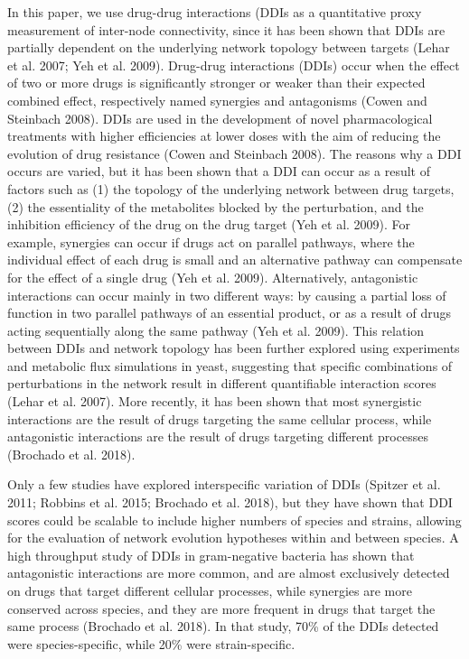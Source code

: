 \documentclass[
]{article}
\begin{document}
In this paper, we use drug-drug interactions (DDIs as a quantitative proxy measurement of inter-node connectivity, since it has been shown that DDIs are partially dependent on the underlying network topology between targets (Lehar et al. 2007; Yeh et al. 2009). Drug-drug interactions (DDIs) occur when the effect of two or more drugs is significantly stronger or weaker than their expected combined effect, respectively named synergies and antagonisms (Cowen and Steinbach 2008). DDIs are used in the development of novel pharmacological treatments with higher efficiencies at lower doses with the aim of reducing the evolution of drug resistance (Cowen and Steinbach 2008). The reasons why a DDI occurs are varied, but it has been shown that a DDI can occur as a result of factors such as (1) the topology of the underlying network between drug targets, (2) the essentiality of the metabolites blocked by the perturbation, and the inhibition efficiency of the drug on the drug target (Yeh et al. 2009). For example, synergies can occur if drugs act on parallel pathways, where the individual effect of each drug is small and an alternative pathway can compensate for the effect of a single drug (Yeh et al. 2009). Alternatively, antagonistic interactions can occur mainly in two different ways: by causing a partial loss of function in two parallel pathways of an essential product, or as a result of drugs acting sequentially along the same pathway (Yeh et al. 2009). This relation between DDIs and network topology has been further explored using experiments and metabolic flux simulations in yeast, suggesting that specific combinations of perturbations in the network result in different quantifiable interaction scores (Lehar et al. 2007). More recently, it has been shown that most synergistic interactions are the result of drugs targeting the same cellular process, while antagonistic interactions are the result of drugs targeting different processes (Brochado et al. 2018).

Only a few studies have explored interspecific variation of DDIs (Spitzer et al. 2011; Robbins et al. 2015; Brochado et al. 2018), but they have shown that DDI scores could be scalable to include higher numbers of species and strains, allowing for the evaluation of network evolution hypotheses within and between species. A high throughput study of DDIs in gram-negative bacteria has shown that antagonistic interactions are more common, and are almost exclusively detected on drugs that target different cellular processes, while synergies are more conserved across species, and they are more frequent in drugs that target the same process (Brochado et al. 2018). In that study, 70\% of the DDIs detected were species-specific, while 20\% were strain-specific.
\end{document}
